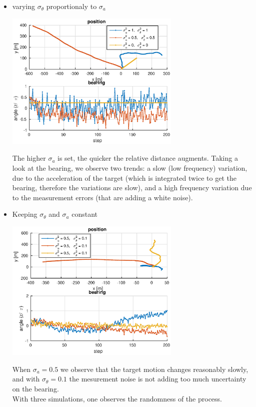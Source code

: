 \documentclass[english,DIV=13]{scrreprt}
\begin{document}
\begin{itemize}
\item varying $\sigma_\theta$ proportionaly to $\sigma_a$
\begin{center}
\includegraphics[width=0.66\textwidth]{img/q2_3.eps}
\end{center}
The higher $\sigma_a$ is set, the quicker the relative distance augments. Taking a look at the bearing,
        we observe two trends: a slow (low frequency) variation, due to the acceleration of the target
         (which is integrated twice to get the bearing, therefore the variations are slow), and 
         a high frequency variation due to the measurement errors (that are adding a white noise).

\item  Keeping $\sigma_\theta$ and $\sigma_a$ constant

\begin{center}
 \includegraphics[width=0.66\textwidth]{img/q2_4.eps}
\end{center}
When $\sigma_a=0.5$ we observe that the target motion changes reasonably slowly, and
with $\sigma_{\theta}=0.1$ the mesurement noise is not adding too much uncertainty on the bearing. \\
With three simulations, one observes the randomness of the process.
\end{itemize}
\end{document}
